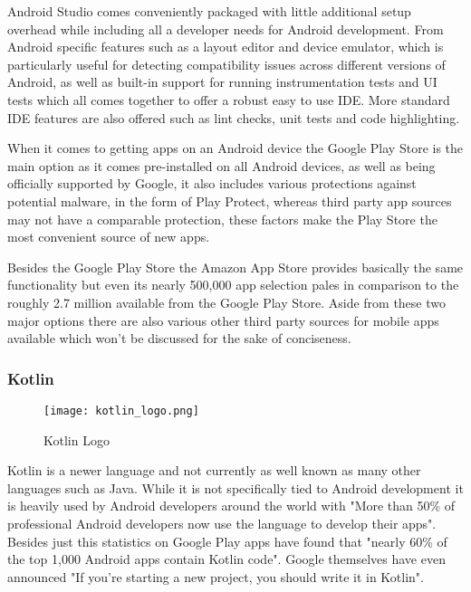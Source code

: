 Android Studio comes conveniently packaged with little additional setup overhead while including all a developer needs for Android development. From Android specific features such as a layout editor and device emulator, which is particularly useful for detecting compatibility issues across different versions of Android, as well as built-in support for running instrumentation tests and UI tests which all comes together to offer a robust easy to use IDE. More standard IDE features are also offered such as lint checks, unit tests and code highlighting.

When it comes to getting apps on an Android device the Google Play Store is the main option as it comes pre-installed on all Android devices, as well as being officially supported by Google, it also includes various protections against potential malware, in the form of Play Protect, whereas third party app sources may not have a comparable protection, these factors make the Play Store the most convenient source of new apps. 

Besides the Google Play Store the Amazon App Store provides basically the same functionality but even its nearly 500,000 app selection\cite{amazonappstoreappcount} pales in comparison to the roughly 2.7 million available from the Google Play Store\cite{playstoreappcount}. Aside from these two major options there are also various other third party sources for mobile apps available which won't be discussed for the sake of conciseness.

\subsubsection{Kotlin}

\begin{figure}[ht]
  \centering
      \texttt{[image: kotlin\_logo.png]}
  \caption[Kotlin Logo]{Kotlin Logo\cite{kotlinlogoresource}}
  \label{fig:kotlinlogo}
\end{figure}

Kotlin is a newer language and not currently as well known as many other languages such as Java. While it is not specifically tied to Android development it is heavily used by Android developers around the world with "More than 50\% of professional Android developers now use the language to develop their apps"\cite{googlekotlinfirstref}. Besides just this statistics on Google Play apps have found that "nearly 60\% of the top 1,000 Android apps contain Kotlin code"\cite{60percentkotlinref}. Google themselves have even announced "If you’re starting a new project, you should write it in Kotlin"\cite{googlekotlinfirstref}\cite{androidkotlindevbookkotlinfirst}.

